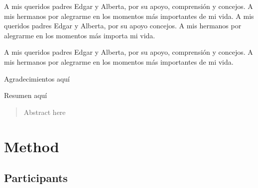 \documentclass[doc, 12pt, a4paper, draftall]{apa7} %
\begin{document}
\maketitle

\begin{epigraph}
  \hfill {\fontsize{9}{13}\selectfont \hfill A mis queridos padres Edgar y Alberta, por  su apoyo, comprensión y concejos. A mis hermanos por alegrarme en los momentos más importantes de mi vida. A mis queridos padres Edgar y Alberta,  por  su apoyo concejos. A mis hermanos por alegrarme en los momentos más importa mi vida.} 
\end{epigraph}

\frontmatter %

\renewcommand\contentsname{\centering Índice}
\tableofcontents
\newpage
\renewcommand\listtablename{\centering Índice de Tablas}
\listoftables
\newpage
\renewcommand\listfigurename{\centering Índice de Figuras}
\listoffigures
\newpage

\begin{dedication}
 \hfill {\fontsize{8}{13}\selectfont A mis queridos padres Edgar y Alberta,  por  su apoyo, comprensión  y  concejos. A mis hermanos por alegrarme en los momentos más importantes de mi vida.}
\end{dedication}
  
\begin{acknowledgments}
  Agradecimientos aquí
\end{acknowledgments}
  
\begin{resumen}
  Resumen aquí
\end{resumen}
  
\begin{abstract}
  Abstract here
\end{abstract}

\mainmatter %

\section{Method}
\subsection{Participants}

\lipsum[2]
\end{document}
